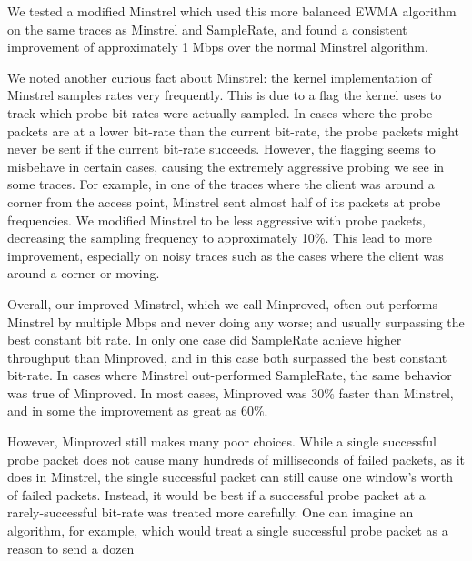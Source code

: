 \documentclass[letterpaper,twocolumn,10pt]{article}
\begin{document}
We tested a modified Minstrel which used this more balanced EWMA
algorithm on the same traces as Minstrel and SampleRate, and found a
consistent improvement of approximately 1 Mbps over the normal
Minstrel algorithm.

We noted another curious fact about Minstrel: the kernel
implementation of Minstrel samples rates very frequently.  This is due
to a flag the kernel uses to track which probe bit-rates were actually
sampled.  In cases where the probe packets are at a lower bit-rate
than the current bit-rate, the probe packets might never be sent if
the current bit-rate succeeds.  However, the flagging seems to
misbehave in certain cases, causing the extremely aggressive probing
we see in some traces.  For example, in one of the traces where the
client was around a corner from the access point, Minstrel sent almost
half of its packets at probe frequencies.  We modified Minstrel to be
less aggressive with probe packets, decreasing the sampling frequency
to approximately 10\%.  This lead to more improvement, especially on
noisy traces such as the cases where the client was around a corner or
moving.

Overall, our improved Minstrel, which we call Minproved, often
out-performs Minstrel by multiple Mbps and never doing any worse; and
usually surpassing the best constant bit rate.  In only one case did
SampleRate achieve higher throughput than Minproved, and in this case
both surpassed the best constant bit-rate.  In cases where Minstrel
out-performed SampleRate, the same behavior was true of Minproved.  In
most cases, Minproved was $30\%$ faster than Minstrel, and in some the
improvement as great as $60\%$.

However, Minproved still makes many poor choices.  While a single
successful probe packet does not cause many hundreds of milliseconds
of failed packets, as it does in Minstrel, the single successful
packet can still cause one window's worth of failed packets.  Instead,
it would be best if a successful probe packet at a rarely-successful
bit-rate was treated more carefully.  One can imagine an algorithm,
for example, which would treat a single successful probe packet as a
reason to send a dozen
\end{document}
